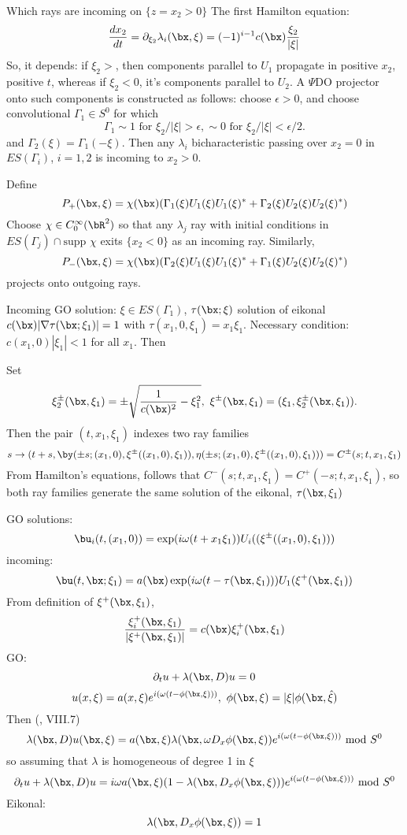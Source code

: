 Which rays are incoming on $\{z=x_2 > 0\}$ The first Hamilton
equation:
\[
  \frac{dx_2}{dt} = \partial_{\xi_2} \lambda_i(\bx,\xi) = (-1)^{i-1}
c(\bx)\frac{\xi_2}{|\xi|}
\]
So, it depends: if $\xi_2 >$, then components parallel to $U_1$
propagate in positive $x_2$, positive $t$, whereas if $\xi_2<0$, it's
components parallel to $U_2$. A $\Psi$DO projector onto such
components is constructed as follows: choose $\epsilon>0$, and choose
convolutional 
$\Gamma_1\in S^0$ for which
\[
  \Gamma_1 \sim 1 \mbox{ for } \xi_2/|\xi| > \epsilon, \sim 0
  \mbox{ for } \xi_2/|\xi|< \epsilon/2.
\]
and $\Gamma_2(\xi) =\Gamma_1(-\xi)$. Then any $\lambda_i$ bicharacteristic passing over
$x_2=0$ in $ES(\Gamma_i)$, $i=1,2$ is incoming to $x_2>0$. 

Define
\[
  P_+(\bx,\xi) = \chi(\bx) (\Gamma_1(\xi)U_1(\xi)U_1(\xi)^* +
  \Gamma_2(\xi)U_2(\xi)U_2(\xi)^*)
\]
Choose $\chi \in C_0^{\infty}(\bR^2)$ so that any $\lambda_j$ ray with initial
conditions in $ES(\Gamma_j) \cap \mbox{supp }\chi$ exits $\{x_2 <
0\}$ as an incoming ray. Similarly,
\[
  P_-(\bx,\xi) = \chi(\bx) (\Gamma_2(\xi)U_1(\xi)U_1(\xi)^* +
  \Gamma_1(\xi)U_2(\xi)U_2(\xi)^*)
\]
projects onto outgoing rays.

Incoming GO solution: $\xi \in ES(\Gamma_1)$, $\tau(\bx;\xi)$ solution
of eikonal $c(\bx)|\nabla \tau(\bx;\xi_1)|=1$ with $\tau(x_1,0,\xi_1)
= x_1\xi_1$. Necessary condition: $c(x_1,0)|\xi_1| < 1$ for all
$x_1$. Then 

Set
\[
  \xi^{\pm}_2(\bx,\xi_1) = \pm \sqrt{\frac{1}{c(\bx)^2} - \xi_1^2},\,\,
  \xi^{\pm}(\bx,\xi_1) = (\xi_1,\xi_2^{\pm}(\bx,\xi_1)).
\]
Then the pair $(t,x_1,\xi_1)$ indexes two ray families
\[
  s \rightarrow (t +
s,\by(\pm s;(x_1,0),\xi^{\pm}((x_1,0),\xi_1)),
\eta(\pm s;(x_1,0),\xi^{\pm}((x_1,0),\xi_1)))  = C^{\pm}(s;t,x_1,\xi_1)
\]
From Hamilton's equations, follows that
$C^{-}(s;t,x_1,\xi_1)=C^{+}(-s;t,x_1,\xi_1)$, so both ray families
generate the same solution of the eikonal, $\tau(\bx,\xi_1)$

GO solutions:
\[
  \bu_i(t,(x_1,0)) =\exp(i\omega(t+x_1\xi_1))U_i((\xi^{\pm}((x_1,0),\xi_1)))
\]
incoming:
\[
 \bu(t,\bx;\xi_1)=a(\bx)
 \exp(i\omega(t-\tau(\bx,\xi_1)))U_1(\xi^+(\bx,\xi_1))
\]
From definition of $\xi^+(\bx,\xi_1)$,
\[
  \frac{\xi^+_i(\bx,\xi_1)}{|\xi^+(\bx,\xi_1)|} = c(\bx) \xi^+_i(\bx,\xi_1)
\]
GO:
\[
  \partial_t u + \lambda(\bx,D)u = 0
\]
\[
  u(x,\xi) = a(x,\xi)e^{i(\omega(t-\phi(\bx,\xi)))},\,\, \phi(\bx,\xi) = |\xi|\phi(\bx,\hat{\xi})
\]
Then (\cite{Tay:81}, VIII.7)
\[
  \lambda(\bx,D)u(\bx,\xi) =a(\bx,\xi)\lambda(\bx,\omega
  D_x\phi(\bx,\xi)) e^{i(\omega(t-\phi(\bx,\xi)))} \mbox{ mod } S^0
\]
so assuming that $\lambda$ is homogeneous of degree 1 in $\xi$
\[
  \partial_t u + \lambda(\bx,D)u = i \omega a(\bx,\xi) (1 -
  \lambda(\bx, D_x\phi(\bx,\xi))) e^{i(\omega(t-\phi(\bx,\xi)))}
  \mbox{ mod } S^0
\]
Eikonal:
\[
  \lambda(\bx, D_x\phi(\bx,\xi))=1
\]



